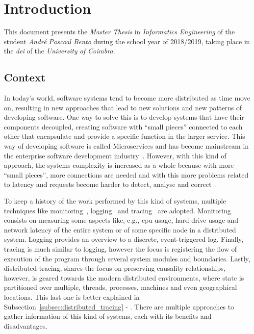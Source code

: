 \glsresetall
\chapter{Introduction}
\label{chap:introduction}

This document presents the \textit{Master Thesis} in \textit{Informatics Engineering} of the student \textit{André Pascoal Bento} during the school year of 2018/2019, taking place in the \textit{\gls{dei}} of the \textit{University of Coimbra}.

\section{Context}
\label{sec:context}

In today's world, software systems tend to become more distributed as time move on, resulting in new approaches that lead to new solutions and new patterns of developing software. One way to solve this is to develop systems that have their components decoupled, creating software with ``small pieces'' connected to each other that encapsulate and provide a specific function in the larger service. This way of developing software is called Microservices and has become mainstream in the enterprise software development industry~\cite{Dragoni2017}. However, with this kind of approach, the systems complexity is increased as a whole because with more ``small pieces'', more connections are needed and with this more problems related to latency and requests become harder to detect, analyse and correct~\cite{DiFrancesco2017}.

To keep a history of the work performed by this kind of systems, multiple techniques like monitoring~\cite{Joyce1987}, logging~\cite{logging} and tracing~\cite{distributed_tracing} are adopted. Monitoring consists on measuring some aspects like, e.g., \gls{cpu} usage, hard drive usage and network latency of the entire system or of some specific node in a distributed system. Logging provides an overview to a discrete, event-triggered log. Finally, tracing is much similar to logging, however the focus is  registering the flow of execution of the program through several system modules and boundaries. Lastly, distributed tracing, shares the focus on preserving causality relationships, however, is geared towards the modern distributed environments, where state is partitioned over multiple, threads, processes, machines and even geographical locations. This last one is better explained in Subsection~\ref{subsec:distributed_tracing} - . There are multiple approaches to gather information of this kind of systems, each with its benefits and disadvantages.

